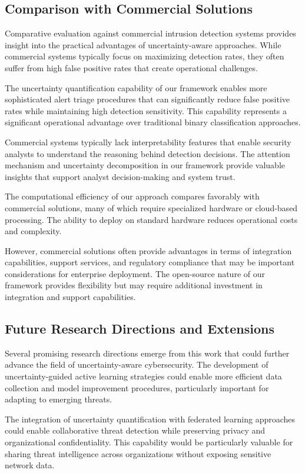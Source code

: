 \documentclass[journal]{IEEEtran}
\begin{document}
\subsection{Comparison with Commercial Solutions}

Comparative evaluation against commercial intrusion detection systems provides insight into the practical advantages of uncertainty-aware approaches. While commercial systems typically focus on maximizing detection rates, they often suffer from high false positive rates that create operational challenges.

The uncertainty quantification capability of our framework enables more sophisticated alert triage procedures that can significantly reduce false positive rates while maintaining high detection sensitivity. This capability represents a significant operational advantage over traditional binary classification approaches.

Commercial systems typically lack interpretability features that enable security analysts to understand the reasoning behind detection decisions. The attention mechanism and uncertainty decomposition in our framework provide valuable insights that support analyst decision-making and system trust.

The computational efficiency of our approach compares favorably with commercial solutions, many of which require specialized hardware or cloud-based processing. The ability to deploy on standard hardware reduces operational costs and complexity.

However, commercial solutions often provide advantages in terms of integration capabilities, support services, and regulatory compliance that may be important considerations for enterprise deployment. The open-source nature of our framework provides flexibility but may require additional investment in integration and support capabilities.

\subsection{Future Research Directions and Extensions}

Several promising research directions emerge from this work that could further advance the field of uncertainty-aware cybersecurity. The development of uncertainty-guided active learning strategies could enable more efficient data collection and model improvement procedures, particularly important for adapting to emerging threats.

The integration of uncertainty quantification with federated learning approaches could enable collaborative threat detection while preserving privacy and organizational confidentiality. This capability would be particularly valuable for sharing threat intelligence across organizations without exposing sensitive network data.
\end{document}
